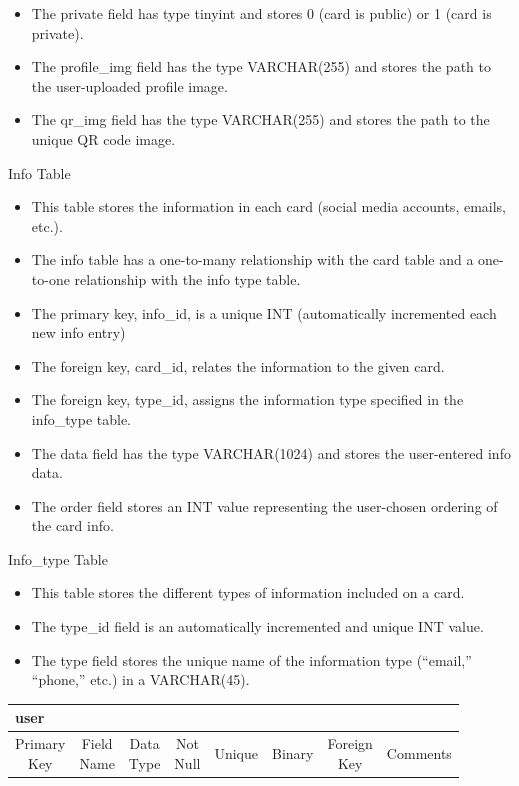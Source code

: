 \documentclass[12pt]{article}%
\begin{document}
\begin{enumerate}[4.a.]
\begin{itemize}
            \item The private field has type tinyint and stores 0 (card is public) or 1 (card is private).
            \item The profile\_img field has the type VARCHAR(255) and stores the path to the user-uploaded profile image.
            \item The qr\_img field has the type VARCHAR(255) and stores the path to the unique QR code image.
        \end{itemize}
    Info Table
            \begin{itemize}
            \item This table stores the information in each card (social media accounts, emails, etc.).
            \item The info table has a one-to-many relationship with the card table and a one-to-one relationship with the info type table.
            \item The primary key, info\_id, is a unique INT (automatically incremented each new info entry)
            \item The foreign key, card\_id, relates the information to the given card.
            \item The foreign key, type\_id, assigns the information type specified in the info\_type table.
            \item The data field has the type VARCHAR(1024) and stores the user-entered info data.
            \item The order field stores an INT value representing the user-chosen ordering of the card info.
        \end{itemize}
    Info\_type Table
            \begin{itemize}
            \item This table stores the different types of information included on a card.
            \item The type\_id field is an automatically incremented and unique INT value.
            \item The type field stores the unique name of the information type (“email,” “phone,” etc.) in a VARCHAR(45).
        \end{itemize}
    \footnotesize
    \singlespacing
    \begin{tabular}{|c|c|c|c|c|c|c|c|}
        \hline
        \multicolumn{8}{|l|}{\bf user}\\
        \hline
        \hline
        \thead{Primary\\Key} & \thead{Field\\Name} & \thead{Data\\Type} & \thead{Not\\Null} & Unique & Binary & \thead{Foreign\\Key} & Comments \\

\end{tabular}
\end{enumerate}
\end{document}
